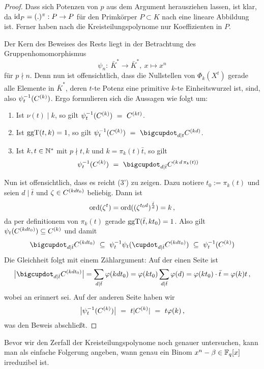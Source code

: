 \begin{proof}
  Dass sich Potenzen von $p$ aus dem Argument herausziehen lassen, ist klar,
  da $\operatorname{id}_P = (.)^\pi: P \to P$ für den Primkörper $P \subset K$ nach 
   eine lineare Abbildung ist. 
  Ferner haben nach  die
  Kreisteilungspolynome nur Koeffizienten in $P$.

  Der Kern des Beweises des Rests liegt in der Betrachtung des 
  Gruppenhomomorphismus
  \[ \psi_n:\ \bar K^\ast \to \bar K^\ast,\ x \mapsto x^n\]
  für $p\nmid n$. Denn nun ist offensichtlich, dass die Nullstellen von 
  $\Phi_k(X^t)$ gerade alle Elemente in $\bar K^\ast$, deren $t$-te Potenz
  eine primitive $k$-te Einheitswurzel ist, sind, also $\psi_t^{-1}(C^{(k)})$.
  Ergo formulieren sich die Aussagen wie folgt um:
  \begin{enumerate}[label=(\arabic*')]
    \item Ist $\nu(t) \mid k$, so gilt
      $\psi_t^{-1}(C^{(k)}) \ =\  C^{(kt)}$.
    \item Ist $\operatorname{ggT}(t,k)=1$, so gilt
      $\psi_t\inv(C\kl k) \speq= \bigcupdot_{d\mid t} C\kl{kd}$.
    \item Ist $k,t\in \mathbb{N}^\ast$ mit $p\nmid t,k$ und $k = \pi_k(t) \bar t$,
      so gilt
      \[ \psi_t\inv(C\kl k) \speq= 
        \bigcupdot_{d\mid \bar t} C\kl{k\,d\,\pi_k(t)}\]
  \end{enumerate}
  Nun ist offensichtlich, dass es reicht (3') zu zeigen. 
  Dazu notiere $t_0 := \pi_k(t)$ und seien $d\mid \bar t$ 
  und $\zeta \in C^{(kd t_0)}$ beliebig. Dann ist 
  \[ \operatorname{ord}(\zeta^t) = \operatorname{ord}((\zeta^{t_0d})^{\frac{\bar t}{d}})
    = k\,,\]
  da per definitionem von $\pi_k(t)$ gerade $\operatorname{ggT}(\bar t, kt_0) = 1$.
  Also gilt $\psi_t(C^{(kdt_0)}) \subseteq C^{(k)}$
  und damit
  \[ \bigcupdot_{d\mid \bar t} C\kl{kdt_0} \speq\subseteq 
    \psi_t\inv \psi_t ( \cupdot_{d\mid \bar t} C\kl{kdt_0}) 
    \speq\subseteq \psi_t\inv(C\kl k)\]
  Die Gleichheit folgt mit einem Zählargument:
  Auf der einen Seite ist
  \[ \big|\bigcupdot_{d\mid \bar t} C\kl{kdt_0}\big| = 
    \sum_{d\mid \bar t} \varphi(kdt_0) = 
    \varphi(kt_0)\sum_{d\mid \bar t}\varphi(d) = \varphi(kt_0) \cdot \bar t
     = \varphi(k)t\,,\]
  wobei an  erinnert sei.
  Auf der anderen Seite haben wir
  \[ \big| \psi_t^{-1}(C ^{(k)})\big| \ =\  t |C^{(k)}| \ =\  t \varphi(k)\,,\]
  was den Beweis abschließt.
\end{proof}

Bevor wir den Zerfall der Kreisteilungspolynome noch genauer untersuchen,
kann man als einfache Folgerung angeben, wann genau ein
Binom $x^n-\beta \in \mathbb{F}_q[x]$ irreduzibel ist.

